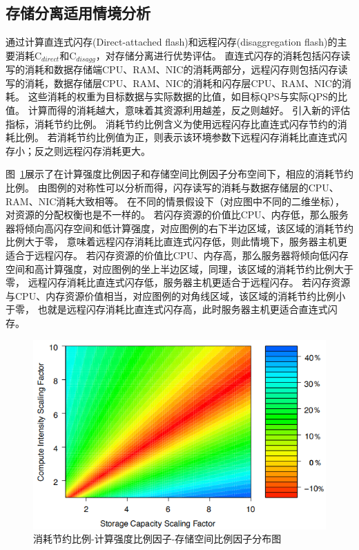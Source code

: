 \subsection{存储分离适用情境分析}
通过计算直连式闪存(Direct-attached flash)和远程闪存(disaggregation flash)的主要消耗C$_{direct}$和C$_{disagg}$，对存储分离进行优势评估。
直连式闪存的消耗包括闪存读写的消耗和数据存储端CPU、RAM、NIC的消耗两部分，远程闪存则包括闪存读写的消耗，数据存储层CPU、RAM、NIC的消耗和闪存层CPU、RAM、NIC的消耗。
这些消耗的权重为目标数据与实际数据的比值，如目标QPS与实际QPS的比值。
计算而得的消耗越大，意味着其资源利用越差，反之则越好。
引入新的评估指标，消耗节约比例。
消耗节约比例含义为使用远程闪存比直连式闪存节约的消耗比例。
若消耗节约比例值为正，则表示该环境参数下远程闪存消耗比直连式闪存小；反之则远程闪存消耗更大。


图~\ref{fig:compute_storage}展示了在计算强度比例因子和存储空间比例因子分布空间下，相应的消耗节约比例。
由图例的对称性可以分析而得，闪存读写的消耗与数据存储层的CPU、RAM、NIC消耗大致相等。
在不同的情景假设下（对应图中不同的二维坐标），对资源的分配权衡也是不一样的。
若闪存资源的价值比CPU、内存低，那么服务器将倾向高闪存空间和低计算强度，对应图例的右下半边区域，该区域的消耗节约比例大于零，
意味着远程闪存消耗比直连式闪存低，则此情境下，服务器主机更适合于远程闪存。
若闪存资源的价值比CPU、内存高，那么服务器将倾向低闪存空间和高计算强度，对应图例的坐上半边区域，同理，该区域的消耗节约比例大于零，
远程闪存消耗比直连式闪存低，服务器主机更适合于远程闪存。
若闪存资源与CPU、内存资源价值相当，对应图例的对角线区域，该区域的消耗节约比例小于零，
也就是远程闪存消耗比直连式闪存高，此时服务器主机更适合直连式闪存。

\begin{figure}
\centering
\includegraphics[scale=0.7]{Figures/storage/compute_storage.jpg}
\decoRule
\caption{消耗节约比例-计算强度比例因子-存储空间比例因子分布图}
\label{fig:compute_storage}
\end{figure}

